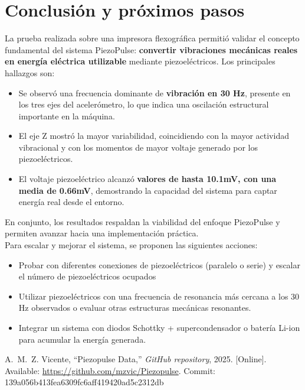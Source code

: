 \documentclass{article}
\begin{document}
\section{Conclusión y próximos pasos}
La prueba realizada sobre una impresora flexográfica permitió validar el concepto fundamental del sistema PiezoPulse: \textbf{convertir vibraciones mecánicas reales en energía eléctrica utilizable} mediante piezoeléctricos. Los principales hallazgos son:
\begin{itemize}
    \item Se observó una frecuencia dominante de \textbf{vibración en 30 Hz}, presente en los tres ejes del acelerómetro, lo que indica una oscilación estructural importante en la máquina.
    \item El eje Z mostró la mayor variabilidad, coincidiendo con la mayor actividad vibracional y con los momentos de mayor voltaje generado por los piezoeléctricos.
    \item El voltaje piezoeléctrico alcanzó \textbf{valores de hasta 10.1mV, con una media de 0.66mV}, demostrando la capacidad del sistema para captar energía real desde el entorno.
\end{itemize}
En conjunto, los resultados respaldan la viabilidad del enfoque PiezoPulse y permiten avanzar hacia una implementación práctica.
\\
Para escalar y mejorar el sistema, se proponen las siguientes acciones:
\begin{itemize}
    \item Probar con diferentes conexiones de piezoeléctricos (paralelo o serie) y escalar el número de piezoeléctricos ocupados
    \item Utilizar piezoeléctricos con una frecuencia de resonancia más cercana a los 30 Hz observados o evaluar otras estructuras mecánicas resonantes.
    \item Integrar un sistema con diodos Schottky + supercondensador o batería Li-ion para acumular la energía generada.

\end{itemize}
\newpage
\begin{thebibliography}{1}

A.~M.~Z. Vicente, ``Piezopulse Data,'' \emph{GitHub repository}, 2025. [Online]. Available: \url{https://github.com/mzvic/Piezopulse}. Commit: 139a056b413fea6309fc6aff419420ad5c2312db

\end{thebibliography}
\printbibliography
\end{document}
